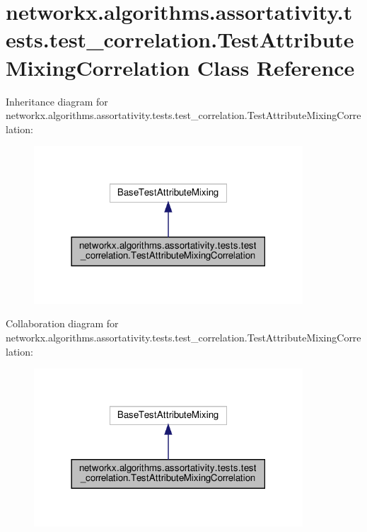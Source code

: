 \hypertarget{classnetworkx_1_1algorithms_1_1assortativity_1_1tests_1_1test__correlation_1_1TestAttributeMixingCorrelation}{}\section{networkx.\+algorithms.\+assortativity.\+tests.\+test\+\_\+correlation.\+Test\+Attribute\+Mixing\+Correlation Class Reference}
\label{classnetworkx_1_1algorithms_1_1assortativity_1_1tests_1_1test__correlation_1_1TestAttributeMixingCorrelation}


Inheritance diagram for networkx.\+algorithms.\+assortativity.\+tests.\+test\+\_\+correlation.\+Test\+Attribute\+Mixing\+Correlation\+:
\nopagebreak
\begin{figure}[H]
\begin{center}
\leavevmode
\includegraphics[width=285pt]{classnetworkx_1_1algorithms_1_1assortativity_1_1tests_1_1test__correlation_1_1TestAttributeMixingCorrelation__inherit__graph}
\end{center}
\end{figure}


Collaboration diagram for networkx.\+algorithms.\+assortativity.\+tests.\+test\+\_\+correlation.\+Test\+Attribute\+Mixing\+Correlation\+:
\nopagebreak
\begin{figure}[H]
\begin{center}
\leavevmode
\includegraphics[width=285pt]{classnetworkx_1_1algorithms_1_1assortativity_1_1tests_1_1test__correlation_1_1TestAttributeMixingCorrelation__coll__graph}
\end{center}
\end{figure}
